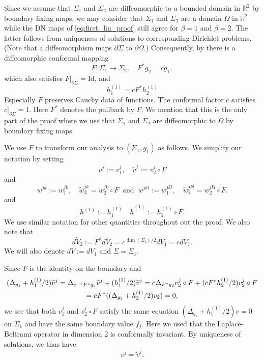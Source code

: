 \documentclass[12pt]{amsart}
\def\p{\partial}
\def\R{\mathbb R}
\theoremstyle{definition}
\theoremstyle{remark}
\newcommand{\s}{\hspace{0.5pt}}
\begin{document}
 Since we assume that $\Sigma_1$  and $\Sigma_2$ are diffeomorphic to a bounded domain in $\R^2$ by boundary fixing maps, we may consider that $\Sigma_1$ and $\Sigma_2$ are a domain $\Omega$ in $\R^2$ while the DN maps of \eqref{eq:first_lin_proof} still agree for $\beta=1$ and $\beta=2$. The latter follows from uniqueness of solutions to corresponding Dirichlet problems. (Note that a diffeomorphism maps $\p \Sigma$ to $\p \Omega$.)  Consequently,  by \cite[Theorem 1.1]{imanuvilov2012partial} there is a diffeomorphic conformal mapping
\[
 F:\Sigma_1\to\Sigma_2, \quad F^*g_2=cg_1,
\]
which also satisfies $F|_{\p \Sigma}=\text{Id}$, and 
\[
 h_{1}^{(1)}=c F^*h_{2}^{(1)}
\]
Especially $F$ preserves Cauchy data of functions. The conformal factor $c$ satisfies $c|_{\p \Sigma}=1$. Here $F^*$ denotes the pullback by $F$. We mention that this is the only part of the proof where we use that $\Sigma_1$ and $\Sigma_2$ are diffeomorphic to $\Omega$ by boundary fixing maps.

We use $F$ to transform our analysis to $(\Sigma_1,g_1)$ as follows. We simplify our notation by setting
\[
 v^{j}:=v^{j}_1, \quad \widetilde v^{j}:=v_2^{j}\circ F
\]
and 
\[
  w^{jk}:=w^{jk}_1, \quad \widetilde w^{jk}_{2}=w_2^{jk}\circ F \ \text{ and } \ w^{jkl}:=w^{jkl}_1, \quad \widetilde w^{jkl}_{2}=w_2^{jkl}\circ F.
\]
and 
\[
 h^{(1)}:=h_{1}^{(1)} \quad \widetilde h^{(1)}:=h_{2}^{(1)}\circ F.
\]
We use similar notation for other quantities throughout out the proof. We also note that
 \[
  d\widetilde V_2:= F^*dV_2=c^{\dim(\Sigma_1)/2}dV_1=cdV_1.
 \]
We will also denote $dV:=dV_1$ and $\Sigma=\Sigma_1$.

Since $F$ is the identity on the boundary and
\begin{multline}\label{eq:morphism_of_sols}
 (\Delta_{g_1}+h_1^{(1)}/2)\widetilde v^{j}=\Delta_{c^{-1}\s F^*g_2}\widetilde v^{j}+(h_1^{(1)}/2)\widetilde v^{j}=c\s \Delta_{F^*g_2}v_2^{j}\circ F+(c F^*h_{2}^{(1)}/2)v_2^{j}\circ F \\
 =c\s F^*((\Delta_{g_2}+h_2^{(1)}/2)v_2)=0,
\end{multline}
we see that both $v^{j}_1$ and $v_2^{j}\circ F$ satisfy the same equation $(\Delta_{g_1}+h_1^{(1)}/2)v=0$ on $\Sigma_1$ and have the same boundary value $f_j$. Here we used that the Laplace-Beltrami operator in dimension $2$ is conformally invariant. By uniqueness of solutions, we thus have
\[
 v^{j}=\widetilde v^{j}.
\]
\end{document}
